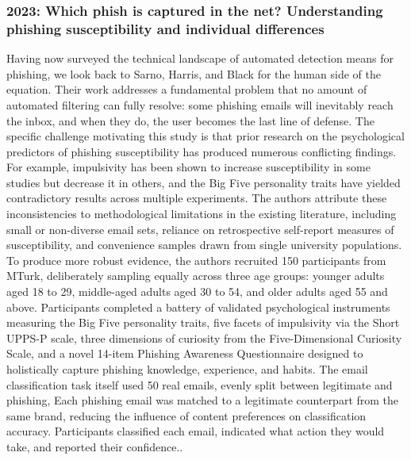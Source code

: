 \documentclass[conference]{IEEEtran}
\begin{document}
\subsubsection{2023: Which phish is captured in the net? Understanding phishing susceptibility and individual differences}
Having now surveyed the technical landscape of automated detection means for phishing, we look back  to Sarno, Harris, and Black for the human side of the equation. Their work addresses a fundamental problem that no amount of automated filtering can fully resolve: some phishing emails will inevitably reach the inbox, and when they do, the user becomes the last line of defense\cite{dawn_m_sarno_which_2023}. The specific challenge motivating this study is that prior research on the psychological predictors of phishing susceptibility has produced numerous conflicting findings. For example, impulsivity has been shown to increase susceptibility in some studies but decrease it in others, and the Big Five personality traits have yielded contradictory results across multiple experiments\cite{dawn_m_sarno_which_2023}. The authors attribute these inconsistencies to methodological limitations in the existing literature, including small or non-diverse email sets, reliance on retrospective self-report measures of susceptibility, and convenience samples drawn from single university populations\cite{dawn_m_sarno_which_2023}.
To produce more robust evidence, the authors recruited 150 participants from  MTurk, deliberately sampling equally across three age groups: younger adults aged 18 to 29, middle-aged adults aged 30 to 54, and older adults aged 55 and above\cite{dawn_m_sarno_which_2023}. Participants completed a battery of validated psychological instruments measuring the Big Five personality traits, five facets of impulsivity via the Short UPPS-P scale, three dimensions of curiosity from the Five-Dimensional Curiosity Scale, and a novel 14-item Phishing Awareness Questionnaire designed to holistically capture phishing knowledge, experience, and habits\cite{dawn_m_sarno_which_2023}. The email classification task itself used 50 real emails, evenly split between legitimate and phishing, Each phishing email was matched to a legitimate counterpart from the same brand, reducing the influence of content preferences on classification accuracy\cite{dawn_m_sarno_which_2023}. Participants classified each email, indicated what action they would take, and reported their confidence.\cite{dawn_m_sarno_which_2023}.
\end{document}
